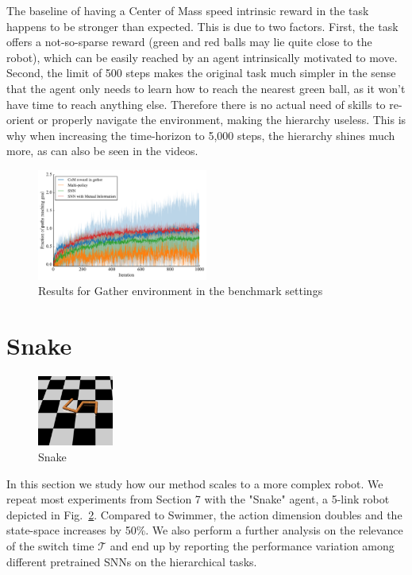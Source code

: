 \documentclass{article} %
\begin{document}
The baseline of having a Center of Mass speed intrinsic reward in the task happens to be stronger than expected. This is due to two factors. First, the task offers a not-so-sparse reward (green and red balls may lie quite close to the robot), which can be easily reached by an agent intrinsically motivated to move. Second, the limit of 500 steps makes the original task much simpler in the sense that the agent only needs to learn how to reach the nearest green ball, as it won't have time to reach anything else. Therefore there is no actual need of skills to re-orient or properly navigate the environment, making the hierarchy useless. This is why when increasing the time-horizon to 5,000 steps, the hierarchy shines much more, as can also be seen in the videos.

\begin{figure}[h!]
	\centering
	\label{fig:learn-gather-benchmark}
	\includegraphics[width = 0.5\textwidth]{Figures/learning-Gather.pdf}
	\caption{Results for Gather environment in the benchmark settings}
\end{figure}


\section{Snake}
\label{sec:snake}

\begin{figure}
\vspace{-20pt}
\includegraphics[trim={2cm 3cm 1cm 1.5cm}, clip, width = 2.5cm]{Figures/snake-curl.png}
\vspace{-15pt}
\caption{Snake}
\label{fig:snake-curl}
\end{figure}

In this section we study how our method scales to a more complex robot. We repeat most experiments from Section 7 with the "Snake" agent, a 5-link robot depicted in Fig.\ \ref{fig:snake-curl}. Compared to Swimmer, the action dimension doubles and the state-space increases by 50\%. We also perform a further analysis on the relevance of the switch time $\mathcal{T}$ and end up by reporting the performance variation among different pretrained SNNs on the hierarchical tasks.
\end{document}
